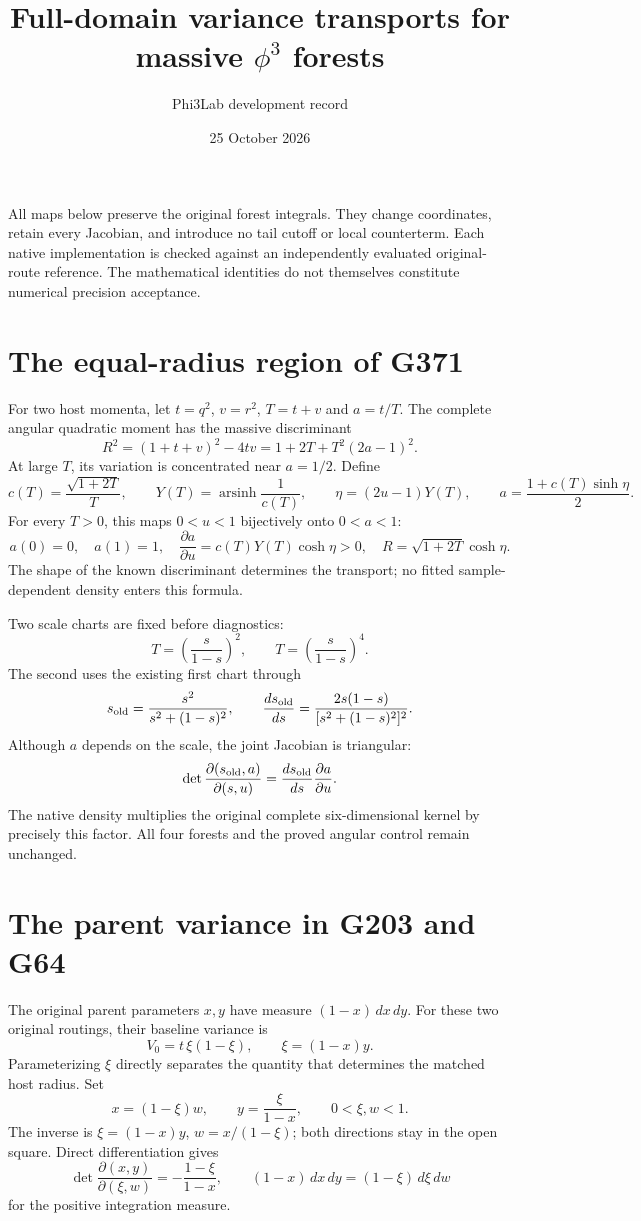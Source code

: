 \documentclass[11pt]{article}
\title{Full-domain variance transports for massive $\phi^3$ forests}
\author{Phi3Lab development record}
\date{25 October 2026}
\begin{document}
\maketitle
All maps below preserve the original forest integrals. They change coordinates,
retain every Jacobian, and introduce no tail cutoff or local counterterm.
Each native implementation is checked against an independently evaluated
original-route reference. The mathematical identities do not themselves
constitute numerical precision acceptance.

\section{The equal-radius region of G371}
For two host momenta, let $t=q^2$, $v=r^2$, $T=t+v$ and $a=t/T$.
The complete angular quadratic moment has the massive discriminant
\[
 R^2=(1+t+v)^2-4tv=1+2T+T^2(2a-1)^2.
\]
At large $T$, its variation is concentrated near $a=1/2$.
Define
\[
 c(T)=\frac{\sqrt{1+2T}}{T},\qquad
 Y(T)=\operatorname{arsinh}\frac1{c(T)},\qquad
 \eta=(2u-1)Y(T),\qquad
 a=\frac{1+c(T)\sinh\eta}{2}.
\]
For every $T>0$, this maps $0<u<1$ bijectively onto $0<a<1$:
\[
 a(0)=0,\quad a(1)=1,\quad
 \frac{\partial a}{\partial u}=c(T)Y(T)\cosh\eta>0,\quad
 R=\sqrt{1+2T}\cosh\eta .
\]
The shape of the known discriminant determines the transport; no fitted
sample-dependent density enters this formula.

Two scale charts are fixed before diagnostics:
\[
 T=\left(\frac{s}{1-s}\right)^2,\qquad
 T=\left(\frac{s}{1-s}\right)^4.
\]
The second uses the existing first chart through
\[
 s_{\rm old}=\frac{s^2}{s^2+(1-s)^2},\qquad
 \frac{ds_{\rm old}}{ds}
 =\frac{2s(1-s)}{[s^2+(1-s)^2]^2}.
\]
Although $a$ depends on the scale, the joint Jacobian is triangular:
\[
 \det\frac{\partial(s_{\rm old},a)}{\partial(s,u)}
 =\frac{ds_{\rm old}}{ds}\frac{\partial a}{\partial u}.
\]
The native density multiplies the original complete six-dimensional kernel
by precisely this factor. All four forests and the proved angular control
remain unchanged.

\section{The parent variance in G203 and G64}
The original parent parameters $x,y$ have measure $(1-x)\,dx\,dy$.
For these two original routings, their baseline variance is
\[
 V_0=t\,\xi(1-\xi),\qquad \xi=(1-x)y.
\]
Parameterizing $\xi$ directly separates the quantity that determines the
matched host radius. Set
\[
 x=(1-\xi)w,\qquad y=\frac{\xi}{1-x},
 \qquad 0<\xi,w<1.
\]
The inverse is $\xi=(1-x)y$, $w=x/(1-\xi)$; both directions stay in the
open square. Direct differentiation gives
\[
 \det\frac{\partial(x,y)}{\partial(\xi,w)}
 =-\frac{1-\xi}{1-x},
 \qquad (1-x)\,dx\,dy=(1-\xi)\,d\xi\,dw
\]
for the positive integration measure.
\end{document}
